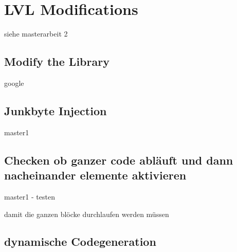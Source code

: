 \section{LVL Modifications}\label{section:lvlModifications}
siehe masterarbeit 2

\subsection{Modify the Library}\label{subsection:basic-}
google

\subsection{Junkbyte Injection}\label{subsection:basic-junkbyte}
master1


\subsection{Checken ob ganzer code abläuft und dann nacheinander elemente aktivieren}\label{subsection:basic-flow}
master1 - testen\newline

damit die ganzen blöcke durchlaufen werden müssen


\subsection{dynamische Codegeneration}\label{subsection:advanced-secure}
